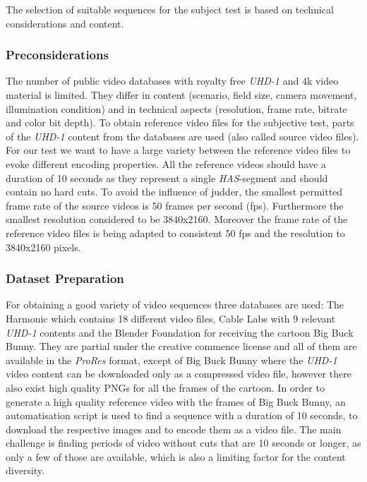 The selection of suitable sequences for the subject test is based on technical considerations and content.

\subsubsection{Preconsiderations}
The number of public video databases with royalty free \textit{UHD-1} and 4k video material is limited. They differ in content (scenario, field size, camera movement, illumination condition) and in technical aspects (resolution, frame rate, bitrate and color bit depth).
To obtain reference video files for the subjective test, parts of the \textit{UHD-1} content from the databases are used (also called source video files).
For our test we want to have a large variety between the reference video files to evoke different encoding properties.
All the reference videos should have a duration of 10 seconds as they represent a single \textit{HAS}-segment and should contain no hard cuts.
To avoid the influence of judder, the smallest permitted frame rate of the source videos is 50 frames per second (fps). Furthermore the smallest resolution considered to be 3840x2160. Moreover the frame rate of the reference video files is being adapted to consistent 50 fps and the resolution to 3840x2160 pixels.

\subsubsection{Dataset Preparation}
For obtaining a good variety of video sequences three databases are used: The Harmonic \cite{web:harmonic} which contains 18 different video files, Cable Labs \cite{web:cablelabs} with 9 relevant \textit{UHD-1} contents and the Blender Foundation \cite{web:bbb} for receiving the cartoon Big Buck Bunny. They  are partial under the creative commence license and all of them are available in the \textit{ProRes} format, except of Big Buck Bunny where the \textit{UHD-1} video content can be downloaded only as a compressed video file, however there also exist high quality PNGs for all the frames of the cartoon. In order to generate a high quality reference video with the frames of Big Buck Bunny, an automatisation script is used to find a sequence with a duration of 10 seconds, to download the respective images and to encode them as a video file.
The main challenge is finding periods of video without cuts that are 10 seconds or longer, as only a few of those are available, which is also a limiting factor for the content diversity.

